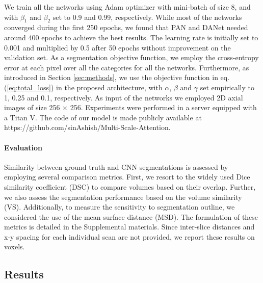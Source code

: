 \documentclass[journal]{IEEEtran}
\begin{document}
We train all the networks using Adam optimizer with mini-batch of size 8, and with $\beta_1$ and $\beta_2$ set to 0.9 and 0.99, respectively. While most of the networks converged during the first 250 epochs, we found that PAN \cite{li2018pyramid} and DANet \cite{fu2018dual} needed around 400 epochs to achieve the best results. The learning rate is initially set to 0.001 and multiplied by 0.5 after 50 epochs without improvement on the validation set. As a segmentation objective function, we employ the cross-entropy error at each pixel over all the categories for all the networks. Furthermore, as introduced in Section \ref{sec:methods}, we use the objective function in eq. (\ref{eq:total_loss}) in the proposed architecture, with $\alpha$, $\beta$ and $\gamma$ set empirically to 1, 0.25 and 0.1, respectively. As input of the networks we employed 2D axial images of size 256 $\times$ 256. Experiments were performed in a server equipped with a Titan V. The code of our model is made publicly available at https://github.com/sinAshish/Multi-Scale-Attention.


\paragraph*{\textbf{Evaluation}}

Similarity between ground truth and CNN segmentations is assessed by employing several comparison metrics. First, we resort to the widely used Dice similarity coefficient (DSC) to compare volumes based on their overlap. Further, we also assess the segmentation performance based on the volume similarity (VS). Additionally, to measure the sensitivity to segmentation outline, we considered the use of the mean surface distance (MSD). %
The formulation of these metrics is detailed in the Supplemental materials. Since inter-slice distances and x-y spacing for each individual scan are not provided, we report these results on voxels. 


\subsection{\textbf{Results}}
\end{document}

